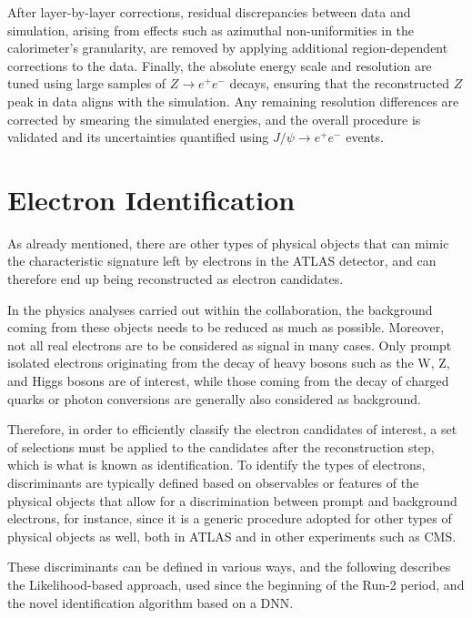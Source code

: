 After layer-by-layer corrections, residual discrepancies between data and simulation, arising from effects such as azimuthal non-uniformities in the calorimeter's granularity, are removed by applying additional region-dependent corrections to the data. Finally, the absolute energy scale and resolution are tuned using large samples of \(Z\to e^+e^-\) decays, ensuring that the reconstructed \(Z\) peak in data aligns with the simulation. Any remaining resolution differences are corrected by smearing the simulated energies, and the overall procedure is validated and its uncertainties quantified using \(J/\psi\to e^+e^-\) events.  

\section{Electron Identification}

As already mentioned, there are other types of physical objects that can mimic the characteristic signature left by electrons in the ATLAS detector, and can therefore end up being reconstructed as electron candidates. 

In the physics analyses carried out within the collaboration, the background coming from these objects needs to be reduced as much as possible. Moreover, not all real electrons are to be considered as signal in many cases. Only prompt isolated electrons originating from the decay of heavy bosons such as the W, Z, and Higgs bosons are of interest, while those coming from the decay of charged quarks or photon conversions are generally also considered as background.

Therefore, in order to efficiently classify the electron candidates of interest, a set of selections must be applied to the candidates after the reconstruction step, which is what is known as identification. To identify the types of electrons, discriminants are typically defined based on observables or features of the physical objects that allow for a discrimination between prompt and background electrons, for instance, since it is a generic procedure adopted for other types of physical objects as well, both in ATLAS and in other experiments such as CMS.

These discriminants can be defined in various ways, and the following describes the Likelihood-based approach, used since the beginning of the Run-2 period, and the novel identification algorithm based on a DNN.

